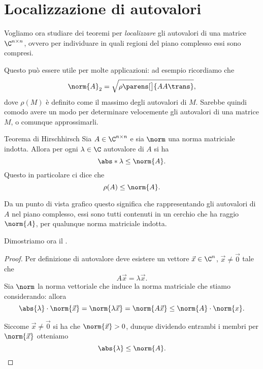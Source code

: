 \section{Localizzazione di autovalori}

Vogliamo ora studiare dei teoremi per \emph{localizzare} gli autovalori di una matrice $\Mat{\C, n, n}$, ovvero per individuare in quali regioni del piano complesso essi sono compresi.

Questo può essere utile per molte applicazioni: ad esempio ricordiamo che \[
    \norm{A}_2 = \sqrt{\rho\parens[\big]{AA\trans}},
\] dove $\rho(M)$ è definito come il massimo degli autovalori di $M$. Sarebbe quindi comodo avere un modo per determinare velocemente gli autovalori di una matrice $M$, o comunque approssimarli.

\begin{theorem}{Teorema di Hirsch}{hirsch}
    Sia $A \in \Mat{\C, n, n}$ e sia $\norm$ una norma matriciale indotta. Allora per ogni $\lambda \in \C$ autovalore di $A$ si ha \[
        \abs*{\lambda} \leq \norm{A}.
    \] Questo in particolare ci dice che \[
        \rho(A) \leq \norm{A}.
    \]
\end{theorem}

Da un punto di vista grafico questo significa che rappresentando gli autovalori di $A$ nel piano complesso, essi sono tutti contenuti in un cerchio che ha raggio $\norm{A}$, per qualunque norma matriciale indotta.

\begin{center}
\end{center}

Dimostriamo ora il .
\begin{proof}
    Per definizione di autovalore deve esistere un vettore $\vec x \in \C^n$, $\vec x \neq \vec 0$ tale che \[
        A\vec x = \lambda\vec x.
    \] Sia $\norm$ la norma vettoriale che induce la norma matriciale che stiamo considerando: allora \[
        \abs{\lambda} \cdot \norm{\vec x}
        = \norm{\lambda\vec x}
        = \norm{A\vec x}
        \leq \norm{A} \cdot \norm{x}.
    \]

    Siccome $\vec x \neq \vec 0$ si ha che $\norm{\vec x} > 0$, dunque dividendo entrambi i membri per $\norm{\vec x}$ otteniamo \[
        \abs{\lambda} \leq \norm{A}. \qedhere
    \]
\end{proof}


